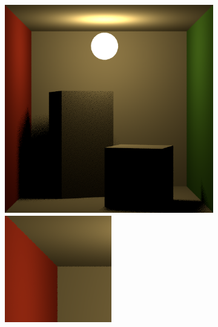 \begin{figure}[h!]
{\begin{minipage}{\dimexpr .33\textwidth-\fboxsep-2\fboxrule}
  \end{minipage}
  \begin{minipage}{\dimexpr .33\textwidth-\fboxsep-2\fboxrule}
   \begin{subfigure}{\textwidth}
            \centering
            \includegraphics[width=\textwidth]{imagenes/sphere7}
            \includegraphics[width=\textwidth]{imagenes/sphere71}

\end{subfigure}
\end{minipage}}
\end{figure}
